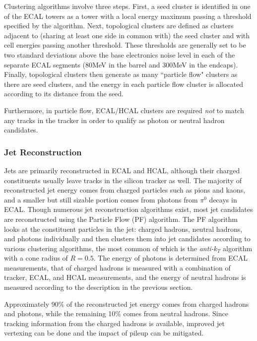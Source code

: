 Clustering algorithms involve three steps. First, a seed cluster is identified in one of the ECAL towers as a tower with a local energy maximum passing a threshold specified by the algorithm. Next, topological clusters are defined as clusters adjacent to (sharing at least one side in common with) the seed cluster and with cell energies passing another threshold. These thresholds are generally set to be two standard deviations above the base electronics noise level in each of the separate ECAL segments (80MeV in the barrel and 300MeV in the endcaps). Finally, topological clusters then generate as many ``particle flow" clusters as there are seed clusters, and the energy in each particle flow cluster is allocated according to its distance from the seed. 

Furthermore, in particle flow, ECAL/HCAL clusters are required \emph{not} to match any tracks in the tracker in order to qualify as photon or neutral hadron candidates.


\subsubsection{Jet Reconstruction}

Jets are primarily reconstructed in ECAL and HCAL, although their charged constituents usually leave tracks in the silicon tracker as well. The majority of reconstructed jet energy comes from charged particles such as pions and kaons, and a smaller but still sizable portion comes from photons from $\pi^0$ decays in ECAL. Though numerous jet reconstruction algorithms exist, most jet candidates are reconstructed using the Particle Flow (PF) algorithm. The PF algorithm looks at the constituent particles in the jet: charged hadrons, neutral hadrons, and photons individually and then clusters them into jet candidates according to various clustering algorithms, the most common of which is the \emph{anti-}$k_{T}$ algorithm with a cone radius of $R = 0.5$. The energy of photons is determined from ECAL measurements, that of charged hadrons is measured with a combination of tracker, ECAL, and HCAL measurements, and the energy of neutral hadrons is measured according to the description in the previous section.

Approximately 90\% of the reconstructed jet energy comes from charged hadrons and photons, while the remaining 10\% comes from neutral hadrons. Since tracking information from the charged hadrons is available, improved jet vertexing can be done and the impact of pileup can be mitigated.




